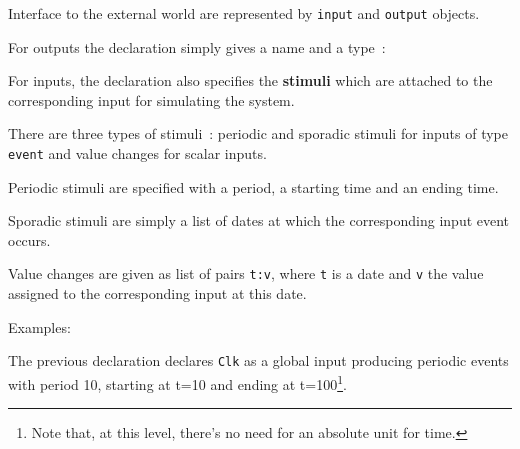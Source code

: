 Interface to the external world are represented by \verb|input| and \verb|output| objects.

\step For outputs the declaration simply gives a name and a type~:

\begin{center}
\end{center}

\step For inputs, the declaration also specifies the \textbf{stimuli} which are attached to the
corresponding input for simulating the system.
\begin{center}
\end{center}

There are three types of stimuli~:
periodic and
sporadic stimuli for inputs of type \verb|event| and value changes for scalar inputs.

\medskip
Periodic stimuli are specified with a period, a starting time and an ending time.

\begin{center}
\end{center}

Sporadic stimuli
are simply a list of dates at which the corresponding input event occurs.

\begin{center}
\end{center}

Value changes are given as
list of pairs \verb|t:v|, where \verb|t| is a date and \verb|v| the value assigned to the
corresponding input at this date. 

\begin{center}
\end{center}

\medskip
Examples:

\begin{center}
\end{center}

The previous declaration declares \verb|Clk| as a global input producing periodic events with period 10, starting
  at t=10 and ending at t=100\footnote{Note that, at this level, there's no need for an absolute
    unit for time.}.

